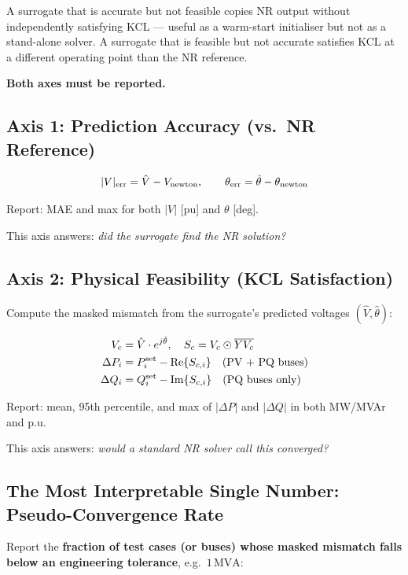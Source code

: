 \documentclass{article}
\begin{document}
A surrogate that is accurate but not feasible copies NR output without
independently satisfying KCL --- useful as a warm-start initialiser but
not as a stand-alone solver.  A surrogate that is feasible but not
accurate satisfies KCL at a different operating point than the NR
reference.

\textbf{Both axes must be reported.}

\subsection{Axis 1: Prediction Accuracy (vs.\ NR Reference)}

\begin{equation}
  |V|_{\rm err} = \hat{V} - V_{\rm newton},
  \qquad
  \theta_{\rm err} = \hat{\theta} - \theta_{\rm newton}
\end{equation}

Report: MAE and max for both $|V|$ [pu] and $\theta$ [deg].

This axis answers: \emph{did the surrogate find the NR solution?}

\subsection{Axis 2: Physical Feasibility (KCL Satisfaction)}

Compute the masked mismatch from the surrogate's predicted voltages
$(\hat{V}, \hat{\theta})$:

\begin{align}
  V_c &= \hat{V} \cdot e^{j\hat{\theta}}, \quad
  S_c  = V_c \odot \overline{Y V_c} \\
  \Delta P_i &= P_i^{\rm set} - \mathrm{Re}\{S_{c,i}\}
    \quad \text{(PV + PQ buses)} \\
  \Delta Q_i &= Q_i^{\rm set} - \mathrm{Im}\{S_{c,i}\}
    \quad \text{(PQ buses only)}
\end{align}

Report: mean, 95th percentile, and max of $|\Delta P|$ and $|\Delta Q|$
in both MW/MVAr and p.u.

This axis answers: \emph{would a standard NR solver call this converged?}

\subsection{The Most Interpretable Single Number: Pseudo-Convergence Rate}

Report the \textbf{fraction of test cases (or buses) whose masked mismatch
falls below an engineering tolerance}, e.g.\ $1\,\mathrm{MVA}$:
\end{document}
